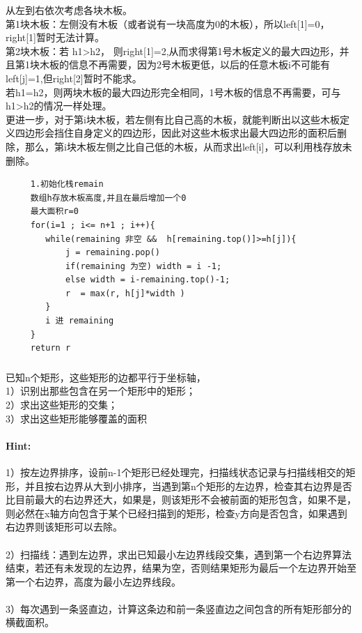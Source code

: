 \documentclass{article}
\begin{document}
     从左到右依次考虑各块木板。\\
     第1块木板：左侧没有木板（或者说有一块高度为0的木板），所以left[1]=0，right[1]暂时无法计算。\\
     第2块木板：若 h1>h2， 则right[1]=2,从而求得第1号木板定义的最大四边形，并且第1块木板的信息不再需要，因为2号木板更低，以后的任意木板i不可能有left[j]=1,但right[2]暂时不能求。\\
     若h1=h2，则两块木板的最大四边形完全相同，1号木板的信息不再需要，可与h1>h2的情况一样处理。\\
     更进一步，对于第i块木板，若左侧有比自己高的木板，就能判断出以这些木板定义四边形会挡住自身定义的四边形，因此对这些木板求出最大四边形的面积后删除，那么，第i块木板左侧之比自己低的木板，从而求出left[i]，可以利用栈存放未删除。\\
     
    \lstset{language=C}
    \begin{lstlisting} 
     1.初始化栈remain
     数组h存放木板高度,并且在最后增加一个0
     最大面积r=0
     for(i=1 ; i<= n+1 ; i++){
        while(remaining 非空 &&  h[remaining.top()]>=h[j]){
            j = remaining.pop()
            if(remaining 为空) width = i -1;
            else width = i-remaining.top()-1;
            r  = max(r, h[j]*width )
        }
        i 进 remaining
     }
     return r
     \end{lstlisting} 
     
     
     
     \subsubsection{}已知n个矩形，这些矩形的边都平行于坐标轴，\\
     1）识别出那些包含在另一个矩形中的矩形；\\
     2）求出这些矩形的交集；\\
     3）求出这些矩形能够覆盖的面积
     \paragraph{Hint:}1）按左边界排序，设前n-1个矩形已经处理完，扫描线状态记录与扫描线相交的矩形，并且按右边界从大到小排序，当遇到第n个矩形的左边界，检查其右边界是否比目前最大的右边界还大，如果是，则该矩形不会被前面的矩形包含，如果不是，则必然在x轴方向包含于某个已经扫描到的矩形，检查y方向是否包含，如果遇到右边界则该矩形可以去除。\\
     \\
2）扫描线：遇到左边界，求出已知最小左边界线段交集，遇到第一个右边界算法结束，若还有未发现的左边界，结果为空，否则结果矩形为最后一个左边界开始至第一个右边界，高度为最小左边界线段。\\
\\
3）每次遇到一条竖直边，计算这条边和前一条竖直边之间包含的所有矩形部分的横截面积。
     
\end{document}
